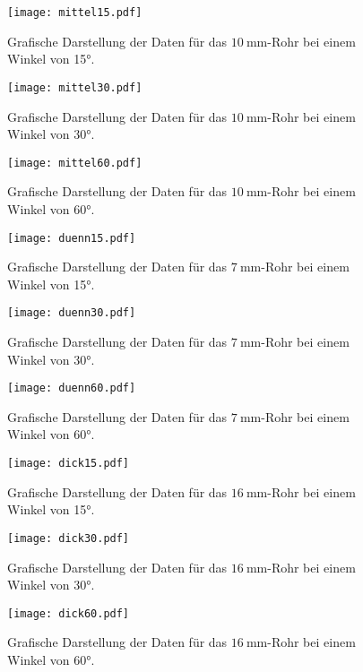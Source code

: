 \begin{figure}
  \centering
  \texttt{[image: mittel15.pdf]}
  \caption{Grafische Darstellung der Daten für das $\SI{10}{\milli\metre}$-Rohr bei einem Winkel von 15°.}
  \label{fig:mittel15}
\end{figure}
\begin{figure}
  \centering
  \texttt{[image: mittel30.pdf]}
  \caption{Grafische Darstellung der Daten für das $\SI{10}{\milli\metre}$-Rohr bei einem Winkel von 30°.}
  \label{fig:mittel30}
\end{figure}
\begin{figure}
  \centering
  \texttt{[image: mittel60.pdf]}
  \caption{Grafische Darstellung der Daten für das $\SI{10}{\milli\metre}$-Rohr bei einem Winkel von 60°.}
  \label{fig:mittel60}
\end{figure}
\begin{figure}
  \centering
  \texttt{[image: duenn15.pdf]}
  \caption{Grafische Darstellung der Daten für das $\SI{7}{\milli\metre}$-Rohr bei einem Winkel von 15°.}
  \label{fig:duenn15}
\end{figure}
\begin{figure}
  \centering
  \texttt{[image: duenn30.pdf]}
  \caption{Grafische Darstellung der Daten für das $\SI{7}{\milli\metre}$-Rohr bei einem Winkel von 30°.}
  \label{fig:duenn30}
\end{figure}
\begin{figure}
  \centering
  \texttt{[image: duenn60.pdf]}
  \caption{Grafische Darstellung der Daten für das $\SI{7}{\milli\metre}$-Rohr bei einem Winkel von 60°.}
  \label{fig:duenn60}
\end{figure}
\begin{figure}
  \centering
  \texttt{[image: dick15.pdf]}
  \caption{Grafische Darstellung der Daten für das $\SI{16}{\milli\metre}$-Rohr bei einem Winkel von 15°.}
  \label{fig:dick15}
\end{figure}
\begin{figure}
  \centering
  \texttt{[image: dick30.pdf]}
  \caption{Grafische Darstellung der Daten für das $\SI{16}{\milli\metre}$-Rohr bei einem Winkel von 30°.}
  \label{fig:dick30}
\end{figure}
\begin{figure}
  \centering
  \texttt{[image: dick60.pdf]}
  \caption{Grafische Darstellung der Daten für das $\SI{16}{\milli\metre}$-Rohr bei einem Winkel von 60°.}
  \label{fig:dick60}
\end{figure}
\FloatBarrier
